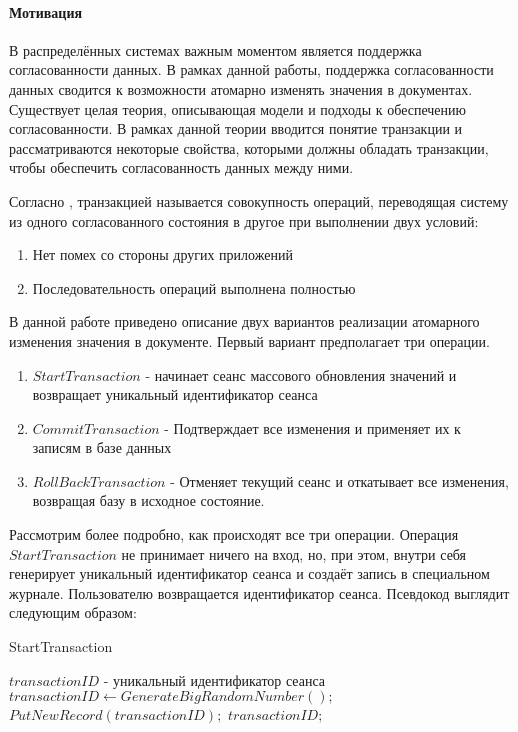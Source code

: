 \documentclass{matmex-diploma}
\begin{document}
        \paragraph{Мотивация} В распределённых системах важным моментом является поддержка согласованности данных. В рамках данной работы, поддержка согласованности данных сводится к возможности атомарно изменять значения в документах. Существует целая теория, описывающая модели и подходы к обеспечению согласованности. В рамках данной теории вводится понятие транзакции и рассматриваются некоторые свойства, которыми должны обладать транзакции, чтобы обеспечить согласованность данных между ними. 
        
        Согласно \cite{novikov}, транзакцией называется совокупность операций, переводящая систему из одного согласованного состояния в другое при выполнении двух условий:
        \begin{enumerate}
            \item Нет помех со стороны других приложений
            \item Последовательность операций выполнена полностью
        \end{enumerate}
        
        В данной работе приведено описание двух вариантов реализации атомарного изменения значения в документе. Первый вариант предполагает три операции.
        \begin{enumerate}
            \item $StartTransaction$ - начинает сеанс массового обновления значений и возвращает уникальный идентификатор сеанса 
            \item $CommitTransaction$ - Подтверждает все изменения и применяет их к записям в базе данных
            \item $RollBackTransaction$ - Отменяет текущий сеанс и откатывает все изменения, возвращая базу в исходное состояние.
        \end{enumerate}    
        Рассмотрим более подробно, как происходят все три операции. Операция $StartTransaction$ не принимает ничего на вход, но, при этом, внутри себя генерирует уникальный идентификатор сеанса и создаёт запись в специальном журнале. Пользователю возвращается идентификатор сеанса. Псевдокод выглядит следующим образом:
            
        \begin{algorithm}[H]                   
        \caption{StartTransaction}              
        \label{startTran1}                        
            \begin{algorithmic}        
                \ENSURE $transactionID$ - уникальный идентификатор сеанса
                \STATE $transactionID \leftarrow GenerateBigRandomNumber();$
                \STATE $PutNewRecord(transactionID);$
                \RETURN $transactionID;$
            \end{algorithmic}
        \end{algorithm}
        
\end{document}
